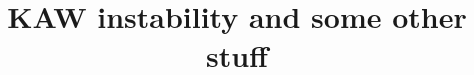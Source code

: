 \documentclass[column]{aastex62}
\begin{document}
	\title{KAW instability and some other stuff}
	
	
\end{document}
